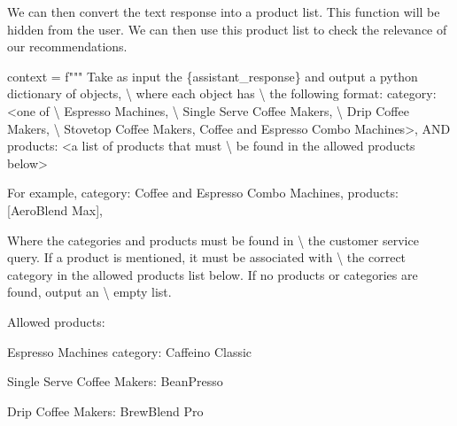 \documentclass[
  letterpaper,
  DIV=11,
  numbers=noendperiod]{scrreprt}
\newenvironment{Shaded}{\begin{snugshade}}{\end{snugshade}}
\newcommand{\CharTok}[1]{\textcolor[rgb]{0.13,0.47,0.30}{#1}}
\newcommand{\NormalTok}[1]{\textcolor[rgb]{0.00,0.23,0.31}{#1}}
\newcommand{\OperatorTok}[1]{\textcolor[rgb]{0.37,0.37,0.37}{#1}}
\newcommand{\SpecialCharTok}[1]{\textcolor[rgb]{0.37,0.37,0.37}{#1}}
\newcommand{\SpecialStringTok}[1]{\textcolor[rgb]{0.13,0.47,0.30}{#1}}
\begin{document}
We can then convert the text response into a product list. This function
will be hidden from the user. We can then use this product list to check
the relevance of our recommendations.

\begin{Shaded}
\begin{Highlighting}[]
\NormalTok{context }\OperatorTok{=} \SpecialStringTok{f"""}
\SpecialStringTok{Take as input the }\SpecialCharTok{\{}\NormalTok{assistant\_response}\SpecialCharTok{\}}\SpecialStringTok{ and output a python dictionary of objects, }\CharTok{\textbackslash{}}
\SpecialStringTok{where each object has }\CharTok{\textbackslash{}}
\SpecialStringTok{the following format:}
\SpecialStringTok{    \textquotesingle{}category\textquotesingle{}: \textless{}one of }\CharTok{\textbackslash{}}
\SpecialStringTok{    Espresso Machines, }\CharTok{\textbackslash{}}
\SpecialStringTok{    Single Serve Coffee Makers, }\CharTok{\textbackslash{}}
\SpecialStringTok{    Drip Coffee Makers, }\CharTok{\textbackslash{}}
\SpecialStringTok{    Stovetop Coffee Makers,}
\SpecialStringTok{    Coffee and Espresso Combo Machines\textgreater{},}
\SpecialStringTok{AND}
\SpecialStringTok{    \textquotesingle{}products\textquotesingle{}: \textless{}a list of products that must }\CharTok{\textbackslash{}}
\SpecialStringTok{    be found in the allowed products below\textgreater{}}

\SpecialStringTok{For example,}
\SpecialStringTok{  \textquotesingle{}category\textquotesingle{}: \textquotesingle{}Coffee and Espresso Combo Machines\textquotesingle{}, \textquotesingle{}products\textquotesingle{}: [\textquotesingle{}AeroBlend Max\textquotesingle{}],}

\SpecialStringTok{Where the categories and products must be found in }\CharTok{\textbackslash{}}
\SpecialStringTok{the customer service query.}
\SpecialStringTok{If a product is mentioned, it must be associated with }\CharTok{\textbackslash{}}
\SpecialStringTok{the correct category in the allowed products list below.}
\SpecialStringTok{If no products or categories are found, output an }\CharTok{\textbackslash{}}
\SpecialStringTok{empty list.}

\SpecialStringTok{Allowed products:}

\SpecialStringTok{Espresso Machines category:}
\SpecialStringTok{Caffeino Classic}

\SpecialStringTok{Single Serve Coffee Makers:}
\SpecialStringTok{BeanPresso}

\SpecialStringTok{Drip Coffee Makers:}
\SpecialStringTok{BrewBlend Pro}


\end{Highlighting}
\end{Shaded}
\end{document}
